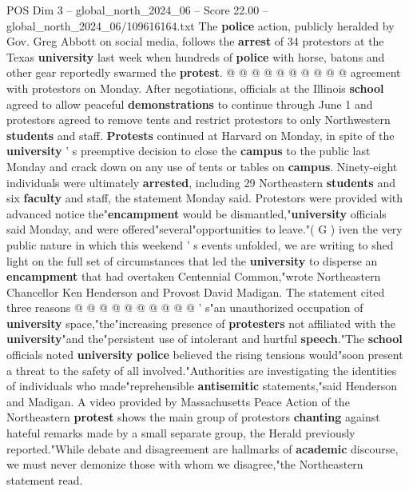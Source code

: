 \begin{textsample}{POS Dim 3 – global\_north\_2024\_06 – Score 22.00 – global\_north\_2024\_06/109616164.txt}
The \textbf{police} action, publicly heralded by Gov.
Greg Abbott on social media, follows the \textbf{arrest} of 34 protestors at the Texas \textbf{university} last week when hundreds of \textbf{police} with horse, batons and other gear reportedly swarmed the \textbf{protest}. @ @ @ @ @ @ @ @ @ @ agreement with protestors on Monday.
After negotiations, officials at the Illinois \textbf{school} agreed to allow peaceful \textbf{demonstrations} to continue through June 1 and protestors agreed to remove tents and restrict protestors to only Northwestern \textbf{students} and staff. \textbf{Protests} continued at Harvard on Monday, in spite of the \textbf{university} ' s preemptive decision to close the \textbf{campus} to the public last Monday and crack down on any use of tents or tables on \textbf{campus}.
Ninety-eight individuals were ultimately \textbf{arrested}, including 29 Northeastern \textbf{students} and six \textbf{faculty} and staff, the statement Monday said.
Protestors were provided with advanced notice the"\textbf{encampment} would be dismantled,"\textbf{university} officials said Monday, and were offered"several"opportunities to leave."( G ) iven the very public nature in which this weekend ' s events unfolded, we are writing to shed light on the full set of circumstances that led the \textbf{university} to disperse an \textbf{encampment} that had overtaken Centennial Common,"wrote Northeastern Chancellor Ken Henderson and Provost David Madigan.
The statement cited three reasons @ @ @ @ @ @ @ @ @ @ ' s"an unauthorized occupation of \textbf{university} space,"the"increasing presence of \textbf{protesters} not affiliated with the \textbf{university}"and the"persistent use of intolerant and hurtful \textbf{speech}."The \textbf{school} officials noted \textbf{university} \textbf{police} believed the rising tensions would"soon present a threat to the safety of all involved."Authorities are investigating the identities of individuals who made"reprehensible \textbf{antisemitic} statements,"said Henderson and Madigan.
A video provided by Massachusetts Peace Action of the Northeastern \textbf{protest} shows the main group of protestors \textbf{chanting} against hateful remarks made by a small separate group, the Herald previously reported."While debate and disagreement are hallmarks of \textbf{academic} discourse, we must never demonize those with whom we disagree,"the Northeastern statement read.

\end{textsample}
